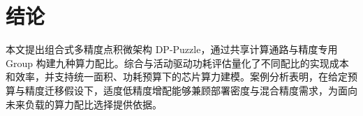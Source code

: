 \section{结论}
\label{sec:conclusion}

本文提出组合式多精度点积微架构 DP-Puzzle，通过共享计算通路与精度专用 Group 构建九种算力配比。综合与活动驱动功耗评估量化了不同配比的实现成本和效率，并支持统一面积、功耗预算下的芯片算力建模。案例分析表明，在给定预算与精度迁移假设下，适度低精度增配能够兼顾部署密度与混合精度需求，为面向未来负载的算力配比选择提供依据。
